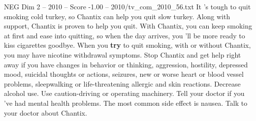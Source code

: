 \begin{textsample}{NEG Dim 2 – 2010 – Score -1.00 – 2010/tv\_com\_2010\_56.txt}  \label{ex:f2_neg_056}
It 's tough to quit smoking cold turkey, so Chantix can help you quit slow turkey.
Along with support, Chantix is proven to help you quit.
With Chantix, you can keep smoking at first and ease into quitting, so when the day arrives, you 'll be more ready to kiss cigarettes goodbye.
When you \textbf{try} to quit smoking, with or without Chantix, you may have nicotine withdrawal symptoms.
Stop Chantix and get help right away if you have changes in behavior or thinking, aggression, hostility, depressed mood, suicidal thoughts or actions, seizures, new or worse heart or blood vessel problems, sleepwalking or life-threatening allergic and skin reactions.
Decrease alcohol use.
Use caution-driving or operating machinery.
Tell your doctor if you 've had mental health problems.
The most common side effect is nausea.
Talk to your doctor about Chantix.

\end{textsample}
